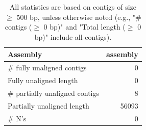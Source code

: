 \documentclass[12pt,a4paper]{article}
\begin{document}
\begin{table}[ht]
\begin{center}
\caption{All statistics are based on contigs of size $\geq$ 500 bp, unless otherwise noted (e.g., "\# contigs ($\geq$ 0 bp)" and "Total length ($\geq$ 0 bp)" include all contigs).}
\begin{tabular}{|l*{1}{|r}|}
\hline
Assembly & assembly \\ \hline
\# fully unaligned contigs & 0 \\ \hline
Fully unaligned length & 0 \\ \hline
\# partially unaligned contigs & 8 \\ \hline
Partially unaligned length & 56093 \\ \hline
\# N's & 0 \\ \hline
\end{tabular}
\end{center}
\end{table}
\end{document}
